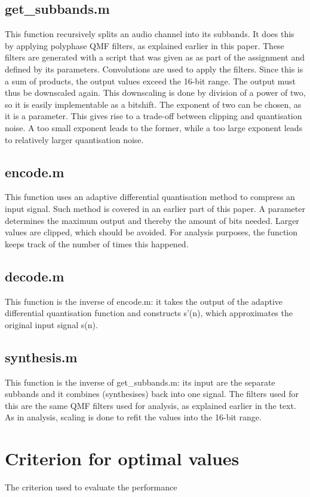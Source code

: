 \documentclass[a4paper]{article}
\begin{document}
\subsection{get\_subbands.m}
This function recursively splits an audio channel into its subbands. It does this by applying polyphase QMF filters, as explained earlier in this paper. These filters are generated with a script that was given as as part of the assignment and defined by its parameters.
Convolutions are used to apply the filters. Since this is a sum of products, the output values exceed the 16-bit range. The output must thus be downscaled again. This downscaling is done by division of a power of two, so it is easily implementable as a bitshift. The exponent of two can be chosen, as it is a parameter. This gives rise to a trade-off between clipping and quantisation noise. A too small exponent leads to the former, while a too large exponent leads to relatively larger quantisation noise.

\subsection{encode.m}
This function uses an adaptive differential quantisation method to compress an input signal. Such method is covered in an earlier part of this paper. A parameter determines the maximum output and thereby the amount of bits needed. Larger values are clipped, which should be avoided. For analysis purposes, the function keeps track of the number of times this happened.

\subsection{decode.m}
This function is the inverse of encode.m: it takes the output of the adaptive differential quantisation function and constructs s'(n), which approximates the original input signal s(n).

\subsection{synthesis.m}
This function is the inverse of get\_subbands.m: its input are the separate subbands and it combines (synthesises) back into one signal. The filters used for this are the same QMF filters used for analysis, as explained earlier in the text. As in analysis, scaling is done to refit the values into the 16-bit range.

\section{Criterion for optimal values}
The criterion used to evaluate the performance 
\end{document}
